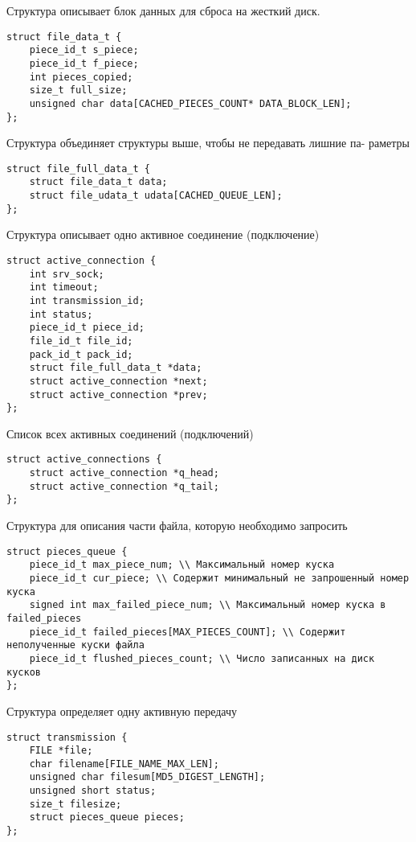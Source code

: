 \begin{appendix}
Структура описывает блок данных для сброса на жесткий диск.
\begin{lstlisting}
struct file_data_t {
    piece_id_t s_piece;
    piece_id_t f_piece;
    int pieces_copied;
    size_t full_size;
    unsigned char data[CACHED_PIECES_COUNT* DATA_BLOCK_LEN];
};
\end{lstlisting}

Структура объединяет структуры выше, чтобы не передавать лишние па-
раметры
\begin{lstlisting}
struct file_full_data_t {
    struct file_data_t data;
    struct file_udata_t udata[CACHED_QUEUE_LEN];
};
\end{lstlisting}

Структура описывает одно активное соединение (подключение)
\begin{lstlisting}
struct active_connection {
    int srv_sock;
    int timeout;
    int transmission_id;
    int status;
    piece_id_t piece_id;
    file_id_t file_id;
    pack_id_t pack_id;
    struct file_full_data_t *data;
    struct active_connection *next;
    struct active_connection *prev;
};
\end{lstlisting}

Список всех активных соединений (подключений)
\begin{lstlisting}
struct active_connections {
    struct active_connection *q_head;
    struct active_connection *q_tail;
};
\end{lstlisting}

Структура для описания части файла, которую необходимо запросить
\begin{lstlisting}
struct pieces_queue {
    piece_id_t max_piece_num; \\ Максимальный номер куска
    piece_id_t cur_piece; \\ Содержит минимальный не запрошенный номер куска
    signed int max_failed_piece_num; \\ Максимальный номер куска в failed_pieces
    piece_id_t failed_pieces[MAX_PIECES_COUNT]; \\ Содержит неполученные куски файла
    piece_id_t flushed_pieces_count; \\ Число записанных на диск кусков
};
\end{lstlisting}

Структура определяет одну активную передачу
\begin{lstlisting}
struct transmission {
    FILE *file;
    char filename[FILE_NAME_MAX_LEN];
    unsigned char filesum[MD5_DIGEST_LENGTH];
    unsigned short status;
    size_t filesize;
    struct pieces_queue pieces;
};
\end{lstlisting}


\end{appendix}
